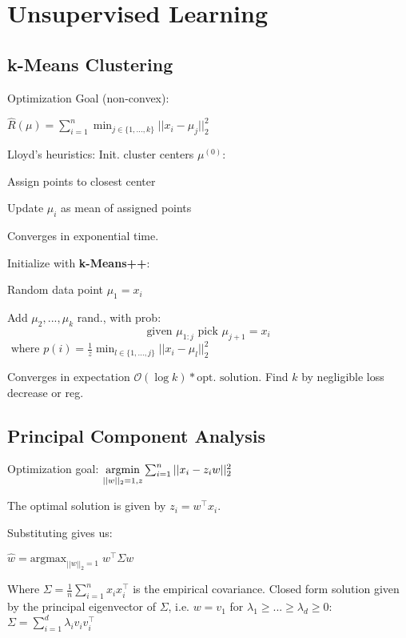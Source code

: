 \section*{Unsupervised Learning}

\subsection*{k-Means Clustering}

Optimization Goal (non-convex):

\qquad $\hat{R} (\mu) = \sum_{i=1}^n \min_{j\in \{1,...,k\}} ||x_i - \mu_j||_2^2$

Lloyd's heuristics:
Init. cluster centers $\mu^{(0)}$:
\begin{compactitem}
	\item Assign points to closest center				
	\item Update $\mu_i$ as mean of assigned points
\end{compactitem}

Converges in exponential time.

Initialize with \textbf{k-Means++}:

\begin{compactitem}
	\item Random data point $\mu_1 = x_i$
	\item Add $\mu_2,...,\mu_k$ rand., with prob:
		$$\text{given } \mu_{1:j} \text{ pick } \mu_{j+1} = x_i$$ 
		$\text{ where } p(i) = \frac{1}{z} \min_{l \in \{1,...,j\}} ||x_i - \mu_l||_2^2$
\end{compactitem}
Converges in expectation $\mathcal O (\log k) * \text{opt. solution}$.
Find $k$ by negligible loss decrease or reg.

\subsection*{Principal Component Analysis}

Optimization goal:
$\underset{||w||_2 = 1, z}{\text{argmin}} \sum_{i=1}^n ||x_i - z_i w||_2^2$

The optimal solution is given by $z_i = w^\top x_i$.  

Substituting gives us:

\qquad \qquad $\hat{w} = \text{argmax}_{||w||_2=1} \; w^\top \Sigma w$

Where $\Sigma = \frac{1}{n} \sum_{i=1}^n x_i x_i^\top$ is the empirical covariance. Closed form solution given by the principal eigenvector of $\Sigma$, i.e. $w = v_1$ for $\lambda_1 \geq ... \geq \lambda_d \geq 0$:
$\Sigma = \sum_{i=1}^d \lambda_i v_i v_i^\top$

